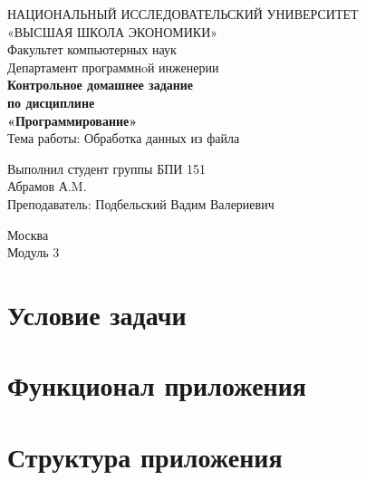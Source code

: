 \documentclass[twoside]{article}
\newcommand{\+}{\discretionary{\mbox{\scriptsize$\hookleftarrow$}}{}{}}
\begin{document}
\begin{titlepage}
\begin{center}
\vspace*{1cm}
{\large НАЦИОНАЛЬНЫЙ ИССЛЕДОВАТЕЛЬСКИЙ УНИВЕРСИТЕТ \\
«ВЫСШАЯ ШКОЛА ЭКОНОМИКИ» }\\
\vspace*{0.5cm}
{\large Факультет компьютерных наук }\\
\vspace*{0.5cm}
{\small Департамент программнoй инженерии \\
}
\vfill %
{\large\textbf{
Контрольное домашнее задание \\
по дисциплине\\
«Программирование» \\
}}
\bigskip
{\large Тема работы: Обработка данных из файла }\\
\vfill
\begin{flushright}
Выполнил студент группы БПИ 151 \\
Абрамов А.M. \\
Преподаватель: Подбельский Вадим Валериевич \\
\end{flushright}
\vfill
Москва \number\year \\
Модуль 3
\end{center}
\end{titlepage}

\tableofcontents
{}

\section{Условие задачи}

\section{Функционал приложения}

\section{Структура приложения}


\end{document}
